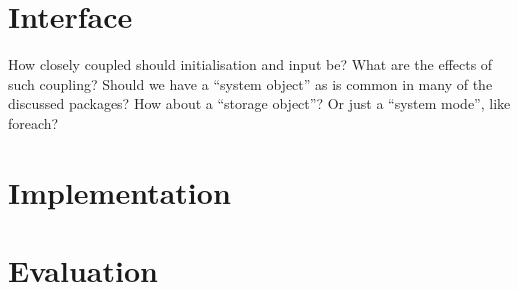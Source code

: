 \documentclass[a4paper,10pt]{article}
\begin{document}
\section{Interface}
How closely coupled should initialisation and input be? What are the effects of such coupling?
Should we have a ``system object'' as is common in many of the discussed packages?
How about a ``storage object''?
Or just a ``system mode'', like foreach?

\section{Implementation}

\section{Evaluation}

\printbibliography
\end{document}
